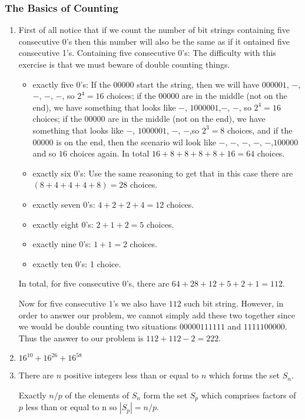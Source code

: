 \documentclass{../../cls/sig-alternate-05-2015}
\begin{document}
\subsubsection{The Basics of Counting}
\begin{enumerate}
	\item First of all notice that if we count the number of bit strings containing five consecutive 0's then this number will also be the same as if it ontained five consecutive 1's.
		Containing five consecutive $0$'s: The difficulty with this exercise is that we must beware of double counting things.
		\begin{itemize}
			\item exactly five $0$'s: If the $00000$ start the string, then we will have $000001$, $-$, $-$, $-$, $-$, so $2^4=16$ choices; if the $00000$ are in the middle (not on the end), we have something that looks like $-$, $1000001$,$-$, $-$, so $2^4=16$ choices; if the $00000$ are in the middle (not on the end), we have something that looks like $-$, $1000001$, $-$, $-$,so $2^3=8$ choices, and if the $00000$ is on the end, then the scenario wil look like $-$, $-$, $-$, $-$, $-$,$100000$ and so $16$ choices again. In total $16+8+8+8+8+16=64$ choices.
			\item exactly six $0$'s: Use the same reasoning to get that in this case there are $(8+4+4+4+8)=28$ choices.
			\item exactly seven $0$'s: $4+2+2+4=12$ choices.
			\item exactly eight $0$'s: $2+1+2=5$ choices.
			\item exactly nine $0$'s: $1+1=2$ choices.
			\item exactly ten $0$'s: 1 choice.
		\end{itemize}
		
		In total, for five consecutive $0$'s, there are $64+28+12+5+2+1=112$.
		
		Now for five consecutive $1$'s we also have $112$ such bit string. However, in order to answer our problem, we cannot simply add these two together since we would be double counting two situations $00000111111$ and $1111100000$. Thus the answer to our problem is $112+112-2=222$.

	\item $16^{10} + 16^{26} + 16^{58}$


	\item There are $n$ positive integers less than or equal to $n$ which forms the set $S_n$. 
	
	Exactly $n/p$ of the elements of $S_n$ form the set $S_p$ which comprises factors of $p$ less than or equal to n so $|S_p|=n/p$.
	

\end{enumerate}
\end{document}

